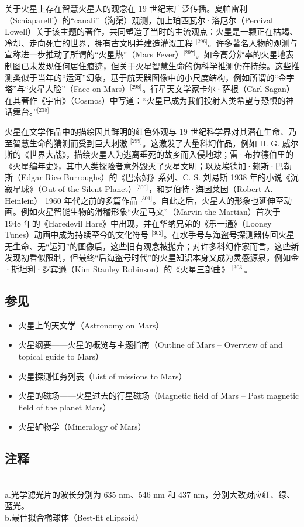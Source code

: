 关于火星上存在智慧火星人的观念在 19 世纪末广泛传播。夏帕雷利（Schiaparelli）的“canali”（沟渠）观测，加上珀西瓦尔·洛厄尔（Percival Lowell）关于该主题的著作，共同塑造了当时的主流观点：火星是一颗正在枯竭、冷却、走向死亡的世界，拥有古文明并建造灌溉工程 \(^{\text{[296]}}\)。许多著名人物的观测与宣称进一步推动了所谓的“火星热”（Mars Fever）\(^{\text{[297]}}\)。如今高分辨率的火星地表制图已未发现任何居住痕迹，但关于火星智慧生命的伪科学推测仍在持续。这些推测类似于当年的“运河”幻象，基于航天器图像中的小尺度结构，例如所谓的“金字塔”与“火星人脸”（Face on Mars）\(^{\text{[298]}}\)。行星天文学家卡尔·萨根（Carl Sagan）在其著作《宇宙》（Cosmos）中写道：“火星已成为我们投射人类希望与恐惧的神话舞台。”\(^{\text{[238]}}\)

火星在文学作品中的描绘因其鲜明的红色外观与 19 世纪科学界对其潜在生命、乃至智慧生命的猜测而受到巨大刺激 \(^{\text{[299]}}\)。这激发了大量科幻作品，例如 H. G. 威尔斯的《世界大战》，描绘火星人为逃离垂死的故乡而入侵地球；雷·布拉德伯里的《火星编年史》，其中人类探险者意外毁灭了火星文明；以及埃德加·赖斯·巴勒斯（Edgar Rice Burroughs）的《巴索姆》系列、C. S. 刘易斯 1938 年的小说《沉寂星球》（Out of the Silent Planet）\(^{\text{[300]}}\)，和罗伯特·海因莱因（Robert A. Heinlein） 1960 年代之前的多篇作品 \(^{\text{[301]}}\)。自此之后，火星人的形象也延伸至动画。例如火星智能生物的滑稽形象“火星马文”（Marvin the Martian）首次于 1948 年的《Haredevil Hare》中出现，并在华纳兄弟的《乐一通》（Looney Tunes）动画中成为持续至今的文化符号 \(^{\text{[302]}}\)。在水手号与海盗号探测器传回火星无生命、无“运河”的图像后，这些旧有观念被抛弃；对许多科幻作家而言，这些新发现初看似限制，但最终“后海盗号时代”的火星知识本身又成为灵感源泉，例如金·斯坦利·罗宾逊（Kim Stanley Robinson）的《火星三部曲》 \(^{\text{[303]}}\)。
\subsection{参见} 
\begin{itemize}
\item 火星上的天文学（Astronomy on Mars）  
\item 火星纲要——火星的概览与主题指南（Outline of Mars – Overview of and topical guide to Mars）  
\item 火星探测任务列表（List of missions to Mars）  
\item 火星的磁场——火星过去的行星磁场（Magnetic field of Mars – Past magnetic field of the planet Mars）  
\item 火星矿物学（Mineralogy of Mars）
\end{itemize}
\subsection{注释}\\  
a.光学滤光片的波长分别为 635 nm、546 nm 和 437 nm，分别大致对应红、绿、蓝光。\\ 
b.最佳拟合椭球体（Best-fit ellipsoid）\\
